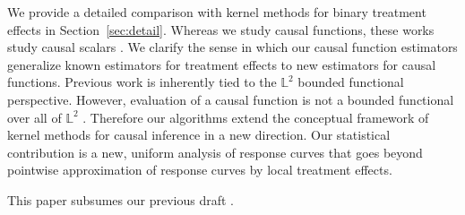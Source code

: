 We provide a detailed comparison with kernel methods for binary treatment effects in Section~\ref{sec:detail}. Whereas we study causal functions, these works study causal scalars \cite{kallus2020generalized,hirshberg2019minimax,singh2021debiased}. We clarify the sense in which our causal function estimators generalize known estimators for treatment effects to new estimators for causal functions. Previous work is inherently tied to the $\mathbb{L}^2$ bounded functional perspective. However, evaluation of a causal function is not a bounded functional over all of $\mathbb{L}^2$ \cite{van1991differentiable,newey1994asymptotic}. Therefore our algorithms extend the conceptual framework of kernel methods for causal inference in a new direction. Our statistical contribution is a new, uniform analysis of response curves that goes beyond pointwise approximation of response curves by local treatment effects. 

This paper subsumes our previous draft \cite[Section 2]{singh2020kernel}.
